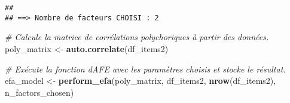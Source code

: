 \documentclass[
]{article}
\newenvironment{Shaded}{\begin{snugshade}}{\end{snugshade}}
\newcommand{\CommentTok}[1]{\textcolor[rgb]{0.56,0.35,0.01}{\textit{#1}}}
\newcommand{\FunctionTok}[1]{\textcolor[rgb]{0.13,0.29,0.53}{\textbf{#1}}}
\newcommand{\NormalTok}[1]{#1}
\newcommand{\OtherTok}[1]{\textcolor[rgb]{0.56,0.35,0.01}{#1}}
\begin{document}
\begin{verbatim}
## 
## ==> Nombre de facteurs CHOISI : 2
\end{verbatim}

\begin{Shaded}
\begin{Highlighting}[]
\CommentTok{\# Calcule la matrice de corrélations polychoriques à partir des données.}
\NormalTok{poly\_matrix }\OtherTok{\textless{}{-}} \FunctionTok{auto.correlate}\NormalTok{(df\_items2)}

\CommentTok{\# Exécute la fonction d\textquotesingle{}AFE avec les paramètres choisis et stocke le résultat.}
\NormalTok{efa\_model }\OtherTok{\textless{}{-}} \FunctionTok{perform\_efa}\NormalTok{(poly\_matrix, df\_items2, }\FunctionTok{nrow}\NormalTok{(df\_items2), n\_factors\_chosen)}
\end{Highlighting}
\end{Shaded}
\end{document}

